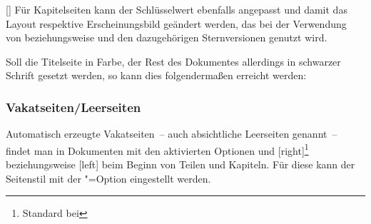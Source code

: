 \begin{Declaration}{[\PSet]}
\printdeclarationlist%
%
%
Für Kapitelseiten kann der Schlüsselwert  ebenfalls angepasst und 
damit das Layout respektive Erscheinungsbild geändert werden, das bei der 
Verwendung von  beziehungsweise  und den 
dazugehörigen Sternversionen genutzt wird.
\end{Declaration}
%
\begin{Example}
Soll die Titelseite in Farbe, der Rest des Dokumentes allerdings in schwarzer 
Schrift gesetzt werden, so kann dies folgendermaßen erreicht werden:
\end{Example}

\subsubsection{Vakatseiten/Leerseiten}
%
Automatisch erzeugte Vakatseiten~-- auch absichtliche Leerseiten genannt~-- 
findet man in Dokumenten mit den aktivierten Optionen  und 
[right]\footnote{Standard bei } beziehungsweise 
[left] beim Beginn von Teilen und Kapiteln. Für diese kann der 
Seitenstil mit der \KOMAScript"=Option  eingestellt 
werden.

